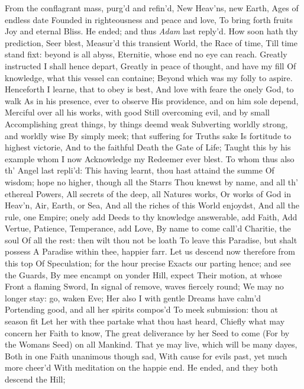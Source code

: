\documentclass[11pt]{book}
\newcounter {last}
\begin{document}
From the conflagrant mass, purg'd and refin'd, 
New Heav'ns, new Earth, Ages of endless date 
Founded in righteousness and peace and love, 
To bring forth fruits Joy and eternal Bliss. 
\quad He ended; and thus \textit{Adam} last reply'd. 
How soon hath thy prediction, Seer blest, 
Measur'd this transient World, the Race of time, 
Till time stand fixt: beyond is all abyss, 
Eternitie, whose end no eye can reach. 
Greatly instructed I shall hence depart, 
Greatly in peace of thought, and have my fill 
Of knowledge, what this vessel can containe; 
Beyond which was my folly to aspire. 
Henceforth I learne, that to obey is best, 
And love with feare the onely God, to walk 
As in his presence, ever to observe 
His providence, and on him sole depend, 
Merciful over all his works, with good 
Still overcoming evil, and by small 
Accomplishing great things, by things deemd weak 
Subverting worldly strong, and worldly wise 
By simply meek; that suffering for Truths sake 
Is fortitude to highest victorie, 
And to the faithful Death the Gate of Life; 
Taught this by his example whom I now 
Acknowledge my Redeemer ever blest. 
\quad To whom thus also th' Angel last repli'd: 
This having learnt, thou hast attaind the summe 
Of wisdom; hope no higher, though all the Starrs 
Thou knewst by name, and all th' ethereal Powers, 
All secrets of the deep, all Natures works, 
Or works of God in Heav'n, Air, Earth, or Sea, 
And all the riches of this World enjoydst, 
And all the rule, one Empire; onely add 
Deeds to thy knowledge answerable, add Faith, 
Add Vertue, Patience, Temperance, add Love, 
By name to come call'd Charitie, the soul 
Of all the rest: then wilt thou not be loath 
To leave this Paradise, but shalt possess 
A Paradise within thee, happier farr. 
Let us descend now therefore from this top 
Of Speculation; for the hour precise 
Exacts our parting hence; and see the Guards, 
By mee encampt on yonder Hill, expect 
Their motion, at whose Front a flaming Sword, 
In signal of remove, waves fiercely round; 
We may no longer stay: go, waken Eve; 
Her also I with gentle Dreams have calm'd 
Portending good, and all her spirits compos'd 
To meek submission: thou at season fit 
Let her with thee partake what thou hast heard, 
Chiefly what may concern her Faith to know, 
The great deliverance by her Seed to come 
(For by the Womans Seed) on all Mankind. 
That ye may live, which will be many dayes, 
Both in one Faith unanimous though sad, 
With cause for evils past, yet much more cheer'd 
With meditation on the happie end. 
\quad He ended, and they both descend the Hill; 
\end{document}
